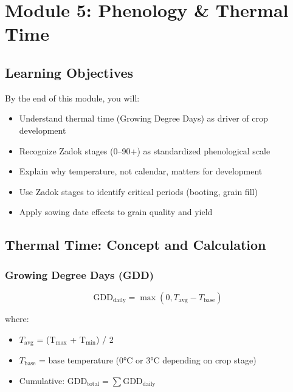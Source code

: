 
\chapter{Module 5: Phenology \& Thermal Time}
\label{ch:module5}

\section{Learning Objectives}

By the end of this module, you will:
\begin{itemize}
  \item Understand thermal time (Growing Degree Days) as driver of crop development
  \item Recognize Zadok stages (0--90+) as standardized phenological scale
  \item Explain why temperature, not calendar, matters for development
  \item Use Zadok stages to identify critical periods (booting, grain fill)
  \item Apply sowing date effects to grain quality and yield
\end{itemize}

\section{Thermal Time: Concept and Calculation}

\subsection{Growing Degree Days (GDD)}

\[
\text{GDD}_{\text{daily}} = \max(0, T_{\text{avg}} - T_{\text{base}})
\]

where:
\begin{itemize}
  \item $T_{\text{avg}}$ = (T$_{\text{max}}$ + T$_{\text{min}}$) / 2
  \item $T_{\text{base}}$ = base temperature (0°C or 3°C depending on crop stage)
  \item Cumulative: $\text{GDD}_{\text{total}} = \sum \text{GDD}_{\text{daily}}$
\end{itemize}

